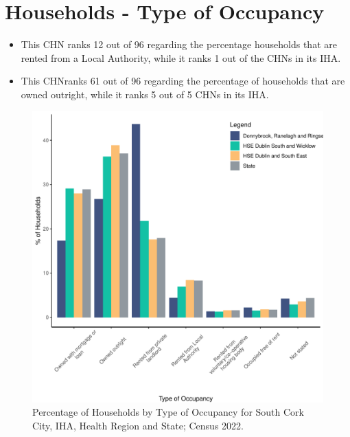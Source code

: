 \documentclass{article}
\begin{document}
\section{Households - Type of Occupancy}\label{sect:Households}
\begin{itemize}
\item This CHN ranks  12 out of 96 regarding the percentage households that are rented from a Local Authority, while it ranks  1 out of the CHNs in its IHA. 
\item This CHNranks  61 out of 96 regarding the percentage of households that are owned outright, while it ranks   5 out of 5 CHNs in its IHA.
\end{itemize}
\begin{figure}[H]
	\centering
	\includegraphics[width = 140mm]{../figures/HouseholdsED.pdf}
	\caption{Percentage of Households by Type of Occupancy for South Cork City, IHA, Health Region and State; Census 2022.}
	\label{fig:vbnv}
	\end{figure}
\end{document}
